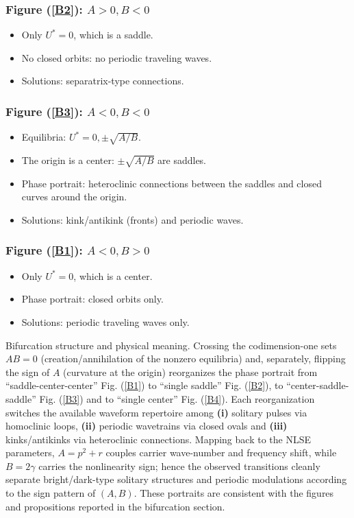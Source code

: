 \documentclass[10pt]{NSP1}
\numberwithin{equation}{section}
\begin{document}
\subsubsection*{Figure (\ref{B2}): $A>0, B<0$}
\begin{itemize}
    \item Only $U^\ast = 0$, which is a saddle.
    \item No closed orbits: no periodic traveling waves.
    \item Solutions: separatrix-type connections.
\end{itemize}

\subsubsection*{Figure (\ref{B3}): $A<0, B<0$}
\begin{itemize}
    \item Equilibria: $U^\ast = 0, \pm \sqrt{A/B}$.
    \item The origin is a center: $\pm \sqrt{A/B}$ are saddles.
    \item Phase portrait: heteroclinic connections between the saddles and closed curves around the origin.
    \item Solutions: kink/antikink (fronts) and periodic waves.
\end{itemize}

\subsubsection*{Figure (\ref{B1}): $A<0, B>0$}
\begin{itemize}
    \item Only $U^\ast = 0$, which is a center.
    \item Phase portrait: closed orbits only.
    \item Solutions: periodic traveling waves only.
\end{itemize}
Bifurcation structure and physical meaning. Crossing the codimension-one sets $AB=0$ (creation/annihilation of the nonzero equilibria) and, separately, flipping the sign of
$A$ (curvature at the origin) reorganizes the phase portrait from ``saddle-center-center'' Fig. (\ref{B1}) to ``single saddle'' Fig. (\ref{B2}), to ``center-saddle-saddle'' Fig. (\ref{B3}) and to ``single center'' Fig. (\ref{B4}). Each reorganization switches the available waveform repertoire among \textbf{(i)} solitary pulses via homoclinic loops, \textbf{(ii)} periodic wavetrains via closed ovals and \textbf{(iii)} kinks/antikinks via heteroclinic connections. Mapping back to the NLSE parameters, $A=p^2+r$ couples carrier wave-number and frequency shift, while $B=2\gamma$ carries the nonlinearity sign; hence the observed transitions cleanly separate bright/dark-type solitary structures and periodic modulations according to the sign pattern of $(A,B)$. These portraits are consistent with the figures and propositions reported in the bifurcation section.
\end{document}
